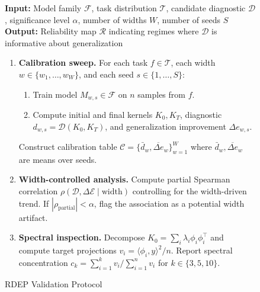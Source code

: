 \documentclass[twoside,11pt]{article}
\begin{document}
\begin{figure}[t]
\caption{RDEP Validation Protocol}
\label{fig:rdep}
\small
\textbf{Input:} Model family $\mathcal{F}$, task distribution $\mathcal{T}$, candidate diagnostic $\mathcal{D}$, significance level $\alpha$, number of widths $W$, number of seeds $S$ \\
\textbf{Output:} Reliability map $\mathcal{R}$ indicating regimes where $\mathcal{D}$ is informative about generalization

\begin{enumerate}
    \item \textbf{Calibration sweep.}
    For each task $f \in \mathcal{T}$, each width $w \in \{w_1, \dots, w_W\}$, and each seed $s \in \{1, \dots, S\}$:
    \begin{enumerate}
        \item Train model $M_{w,s} \in \mathcal{F}$ on $n$ samples from $f$.
        \item Compute initial and final kernels $K_0, K_T$, diagnostic $d_{w,s} = \mathcal{D}(K_0, K_T)$, and generalization improvement $\Delta e_{w,s}$.
    \end{enumerate}
    Construct calibration table $\mathcal{C} = \{\bar{d}_w, \overline{\Delta e}_w\}_{w=1}^W$ where $\bar{d}_w, \overline{\Delta e}_w$ are means over seeds.

    \item \textbf{Width-controlled analysis.}
    Compute partial Spearman correlation $\rho(\mathcal{D}, \Delta\mathcal{E} \mid \text{width})$ controlling for the width-driven trend.  If $|\rho_{\text{partial}}| < \alpha$, flag the association as a potential width artifact.

    \item \textbf{Spectral inspection.}
    Decompose $K_0 = \sum_i \lambda_i \phi_i \phi_i^\top$ and compute target projections $v_i = \langle \phi_i, y \rangle^2 / n$.  Report spectral concentration $c_k = \sum_{i=1}^k v_i / \sum_{i=1}^n v_i$ for $k \in \{3, 5, 10\}$.


\end{enumerate}
\end{figure}
\end{document}
